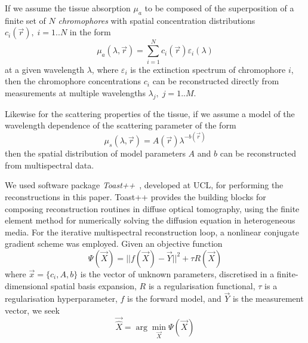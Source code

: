 If we assume the tissue absorption $\mu_a$ to be composed of the superposition of a finite set of $N$ \emph{chromophores} with spatial concentration distributions $c_i(\vec{r}),\;i=1..N$ in the form
\begin{equation}
\mu_a(\lambda,\vec{r}) = \sum_{i=1}^N c_i(\vec{r}) \varepsilon_i(\lambda)
\end{equation}
at a given wavelength $\lambda$, where $\varepsilon_i$ is the extinction spectrum of chromophore $i$, then the chromophore concentrations $c_i$ can be reconstructed directly from measurements at multiple wavelengths $\lambda_j,\;j=1..M$.

Likewise for the scattering properties of the tissue, if we assume a model of the wavelength dependence of the scattering parameter of the form
\begin{equation}
\mu_s(\lambda,\vec{r}) = A(\vec{r}) \lambda^{-b(\vec{r})}
\end{equation}
then the spatial distribution of model parameters $A$ and $b$ can be reconstructed from multispectral data.

We used software package \emph{Toast++}~\cite{schweiger2014a}, developed at UCL, for performing the reconstructions in this paper. Toast++ provides the building blocks for composing reconstruction routines in diffuse optical tomography, using the finite element method for numerically solving the diffusion equation in heterogeneous media. For the iterative multispectral reconstruction loop, a nonlinear conjugate gradient scheme was employed. Given an objective function
\begin{equation}
\Psi(\vec{X}) = ||f(\vec{X})-\vec{Y}||^2 + \tau R(\vec{X})
\end{equation}
where $\vec{x} = \lbrace c_i, A, b \rbrace$ is the vector of unknown parameters, discretised in a finite-dimensional spatial basis expansion, $R$ is a regularisation functional, $\tau$ is a regularisation hyperparameter, $f$ is the forward model, and $\vec{Y}$ is the measurement vector, we seek
\begin{equation}
\vec{\hat{X}} = \arg \min_{\vec{X}} \Psi(\vec{X})
\end{equation}


